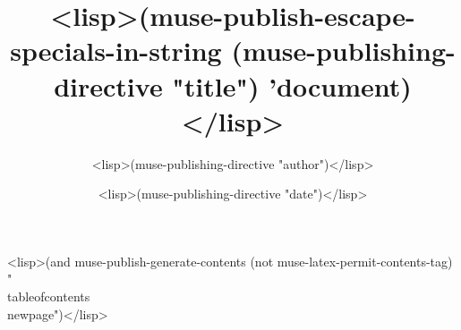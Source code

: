 \documentclass{article}
\begin{document}
\title{<lisp>(muse-publish-escape-specials-in-string
  (muse-publishing-directive "title") 'document)</lisp>}
\author{<lisp>(muse-publishing-directive "author")</lisp>}
\date{<lisp>(muse-publishing-directive "date")</lisp>}

\maketitle

<lisp>(and muse-publish-generate-contents
           (not muse-latex-permit-contents-tag)
           "\\tableofcontents
\\newpage")</lisp>
\end{document}
